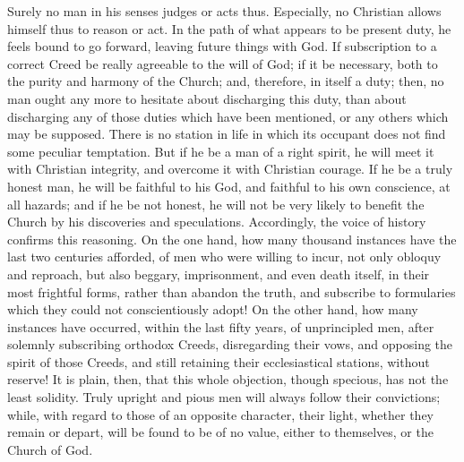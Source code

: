 \documentclass[
]{book}
\begin{document}
Surely no man in his senses judges or acts thus. Especially, no Christian allows himself thus to reason or act. In the path of what appears to be present duty, he feels bound to go forward, leaving future things with God. If subscription to a correct Creed be really agreeable to the will of God; if it be necessary, both to the purity and harmony of the Church; and, therefore, in itself a duty; then, no man ought any more to hesitate about discharging this duty, than about discharging any of those duties which have been mentioned, or any others which may be supposed. There is no station in life in which its occupant does not find some peculiar temptation. But if he be a man of a right spirit, he will meet it with Christian integrity, and overcome it with Christian courage. If he be a truly honest man, he will be faithful to his God, and faithful to his own conscience, at all hazards; and if he be not honest, he will not be very likely to benefit the Church by his discoveries and speculations. Accordingly, the voice of history confirms this reasoning. On the one hand, how many thousand instances have the last two centuries afforded, of men who were willing to incur, not only obloquy and reproach, but also beggary, imprisonment, and even death itself, in their most frightful forms, rather than abandon the truth, and subscribe to formularies which they could not conscientiously adopt! On the other hand, how many instances have occurred, within the last fifty years, of unprincipled men, after solemnly subscribing orthodox Creeds, disregarding their vows, and opposing the spirit of those Creeds, and still retaining their ecclesiastical stations, without reserve! It is plain, then, that this whole objection, though specious, has not the least solidity. Truly upright and pious men will always follow their convictions; while, with regard to those of an opposite character, their light, whether they remain or depart, will be found to be of no value, either to themselves, or the Church of God.
\end{document}
